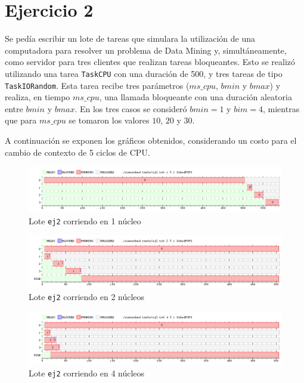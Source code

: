 \section{Ejercicio 2}

Se pedía escribir un lote de tareas que simulara la utilización de una
computadora para resolver un problema de Data Mining y, simultáneamente, como
servidor para tres clientes que realizan tareas bloqueantes. Esto se realizó
utilizando una tarea \texttt{TaskCPU} con una duración de 500, y tres tareas de
tipo \texttt{TaskIORandom}. Esta tarea recibe tres parámetros ($ms\_cpu$, $bmin$
y $bmax$) y realiza, en tiempo $ms\_cpu$, una llamada bloqueante con una duración
aleatoria entre $bmin$ y $bmax$. En los tres casos se consideró $bmin = 1$ y
$bim = 4$, mientras que para $ms\_cpu$ se tomaron los valores $10$, $20$ y $30$.

A continuación se exponen los gráficos obtenidos, considerando un costo para
el cambio de contexto de 5 ciclos de CPU.

\begin{figure}[H]
    \begin{center}
        \includegraphics[width=1\columnwidth]{imagenes/ej2_1.png}
        \caption{Lote \texttt{ej2} corriendo en 1 núcleo}
    \end{center}
\end{figure}

\begin{figure}[H]
    \begin{center}
        \includegraphics[width=1\columnwidth]{imagenes/ej2_2.png}
        \caption{Lote \texttt{ej2} corriendo en 2 núcleos}
    \end{center}
\end{figure}

\begin{figure}[H]
    \begin{center}
        \includegraphics[width=1\columnwidth]{imagenes/ej2_3.png}
        \caption{Lote \texttt{ej2} corriendo en 4 núcleos}
    \end{center}
\end{figure}

